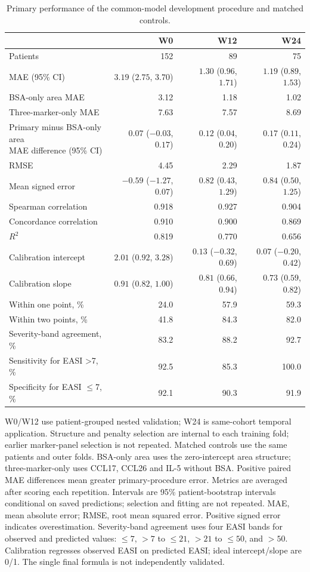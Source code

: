 \begin{table}[htbp]
\centering\small
\caption{Primary performance of the common-model development procedure and matched controls.}\label{tab:model_full}
\begin{tabular}{lrrr}\toprule
 & W0 & W12 & W24 \\ \midrule
Patients & 152 & 89 & 75 \\
MAE (95\% CI) & $3.19$ ($2.75$, $3.70$) & $1.30$ ($0.96$, $1.71$) & $1.19$ ($0.89$, $1.53$) \\
BSA-only area MAE & 3.12 & 1.18 & 1.02 \\
Three-marker-only MAE & 7.63 & 7.57 & 8.69 \\
\shortstack[l]{Primary minus BSA-only area\\MAE difference (95\% CI)} & $0.07$ ($-0.03$, $0.17$) & $0.12$ ($0.04$, $0.20$) & $0.17$ ($0.11$, $0.24$) \\
RMSE & 4.45 & 2.29 & 1.87 \\
Mean signed error & $-0.59$ ($-1.27$, $0.07$) & $0.82$ ($0.43$, $1.29$) & $0.84$ ($0.50$, $1.25$) \\
Spearman correlation & 0.918 & 0.927 & 0.904 \\
Concordance correlation & 0.910 & 0.900 & 0.869 \\
$R^2$ & 0.819 & 0.770 & 0.656 \\
Calibration intercept & $2.01$ ($0.92$, $3.28$) & $0.13$ ($-0.32$, $0.69$) & $0.07$ ($-0.20$, $0.42$) \\
Calibration slope & $0.91$ ($0.82$, $1.00$) & $0.81$ ($0.66$, $0.94$) & $0.73$ ($0.59$, $0.82$) \\
Within one point, \% & 24.0 & 57.9 & 59.3 \\
Within two points, \% & 41.8 & 84.3 & 82.0 \\
Severity-band agreement, \% & 83.2 & 88.2 & 92.7 \\
Sensitivity for EASI >7, \% & 92.5 & 85.3 & 100.0 \\
Specificity for EASI $\leq$7, \% & 92.1 & 90.3 & 91.9 \\
\bottomrule\end{tabular}
\par\small\raggedright W0/W12 use patient-grouped nested validation; W24 is same-cohort temporal application. Structure and penalty selection are internal to each training fold; earlier marker-panel selection is not repeated. Matched controls use the same patients and outer folds. BSA-only area uses the zero-intercept area structure; three-marker-only uses CCL17, CCL26 and IL-5 without BSA. Positive paired MAE differences mean greater primary-procedure error. Metrics are averaged after scoring each repetition. Intervals are 95\% patient-bootstrap intervals conditional on saved predictions; selection and fitting are not repeated. MAE, mean absolute error; RMSE, root mean squared error. Positive signed error indicates overestimation. Severity-band agreement uses four EASI bands for observed and predicted values: $\leq7$, $>7$ to $\leq21$, $>21$ to $\leq50$, and $>50$. Calibration regresses observed EASI on predicted EASI; ideal intercept/slope are 0/1. The single final formula is not independently validated.\end{table}
